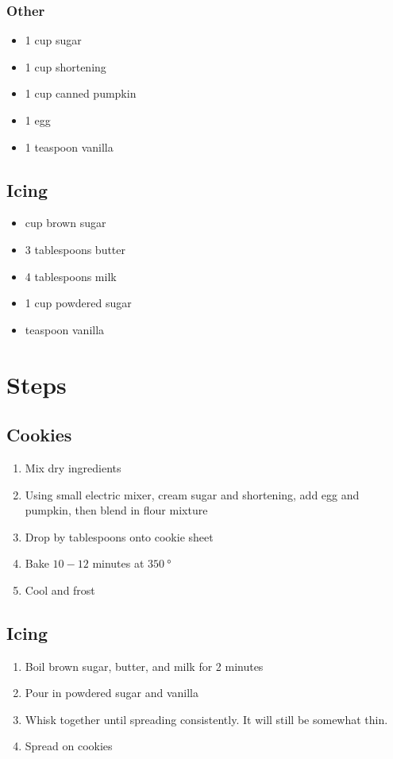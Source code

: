 \documentclass[12pt]{article}
\newcommand{\pt}[1]{
    \section*{#1}
}
\newcommand{\spt}[1]{
    \subsection*{#1}
}
\newcommand{\sspt}[1]{
    \subsubsection*{#1}
}
\newcommand{\temp}[1]{$\SI{#1}{\degree}$}
\begin{document}
\sspt{Other}
\begin{itemize}
    \item 1 cup sugar
    \item 1 cup shortening
    \item 1 cup canned pumpkin
    \item 1 egg
    \item 1 teaspoon vanilla
\end{itemize}
\spt{Icing}
\begin{itemize}
    \item {} cup brown sugar
    \item 3 tablespoons butter
    \item 4 tablespoons milk
    \item 1 cup powdered sugar
    \item {} teaspoon vanilla
\end{itemize}
\clearpage
\pt{Steps}
\spt{Cookies}
\begin{enumerate}
    \item Mix dry ingredients
    \item Using small electric mixer, cream sugar and shortening, add egg and pumpkin, then blend in flour mixture
    \item Drop by tablespoons onto cookie sheet
    \item Bake $10-12$ minutes at \temp{350}
    \item Cool and frost
\end{enumerate}
\spt{Icing}
\begin{enumerate}
    \item Boil brown sugar, butter, and milk for 2 minutes
    \item Pour in powdered sugar and vanilla
    \item Whisk together until spreading consistently. It will still be somewhat thin.
    \item Spread on cookies
\end{enumerate}
\end{document}
